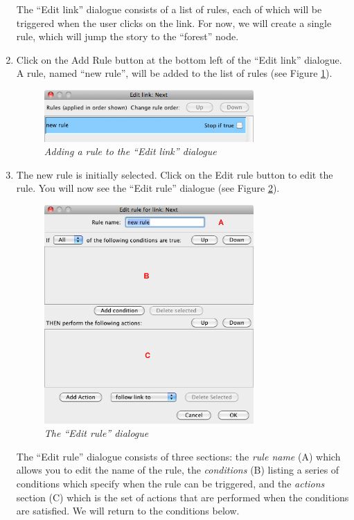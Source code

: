 \documentclass{article}
\begin{document}
\begin{enumerate}
The ``Edit link'' dialogue consists of a list of rules, each of which will be
triggered when the user clicks on the link. For now, we will create a single
rule, which will jump the story to the ``forest'' node.

\item Click on the Add Rule button at the bottom left of the ``Edit link''
dialogue. A rule, named ``new rule'', will be added to the list of rules (see
Figure \ref{fig:new_rule}).

\begin{figure}[ht]
  \centering
  \includegraphics[width=8cm]{images/hypedyn-tutorial-1-figure-8b}
  \caption{\textit{Adding a rule to the ``Edit link'' dialogue}}
  \label{fig:new_rule}
\end{figure} 

\item The new rule is initially selected. Click on the Edit rule button to edit
the rule. You will now see the ``Edit rule'' dialogue (see Figure
\ref{fig:edit_rule}).

\begin{figure}[ht]
  \centering
  \includegraphics[width=8cm]{images/hypedyn-tutorial-1-figure-8c}
  \caption{\textit{The ``Edit rule'' dialogue}}
  \label{fig:edit_rule}
\end{figure} 

The ``Edit rule'' dialogue consists of three sections: the \textit{rule name} (A)
which allows you to edit the name of the rule, the \textit{conditions} (B)
listing a series of conditions which specify when the rule can be triggered, and
the \textit{actions} section (C) which is the set of actions that are performed
when the conditions are satisfied. We will return to the conditions below.


\end{enumerate}
\end{document}
